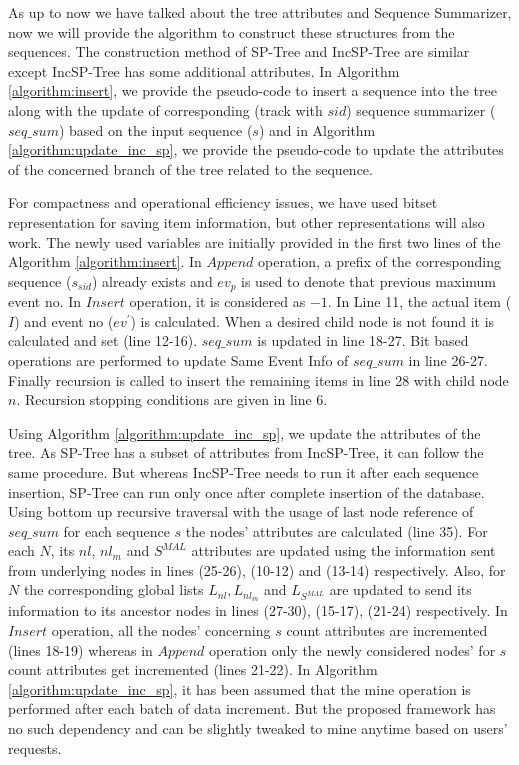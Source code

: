 As up to now we have talked about the tree attributes and Sequence Summarizer, now we will provide the algorithm to construct these structures from the sequences. The construction method of SP-Tree and IncSP-Tree are similar except IncSP-Tree has some additional attributes. In Algorithm \ref{algorithm:insert}, we provide the pseudo-code to insert a sequence into the tree along with the update of corresponding (track with $sid$) sequence summarizer ($seq\_sum$) based on the input sequence ($s$) and in Algorithm \ref{algorithm:update_inc_sp}, we provide the pseudo-code to update the attributes of the concerned branch of the tree related to the sequence.

For compactness and operational efficiency issues, we have used bitset representation for saving item information, but other representations will also work. The newly used variables are initially provided in the first two lines of the Algorithm \ref{algorithm:insert}. In $Append$ operation, a prefix of the corresponding sequence ($s_{sid}$) already exists and $ev_{p}$ is used to denote that previous maximum event no. In $Insert$ operation, it is considered as $-1$. In Line 11, the actual item ($I$) and event no ($ev^{\prime}$) is calculated. When a desired child node is not found it is calculated and set (line 12-16). $seq\_sum$ is updated in line 18-27. Bit based operations are performed to update Same Event Info of $seq\_sum$ in line 26-27. Finally recursion is called to insert the remaining items in line 28 with child node $n$. Recursion stopping conditions are given in line 6.

Using Algorithm \ref{algorithm:update_inc_sp}, we update the attributes of the tree. As SP-Tree has a subset of attributes from IncSP-Tree, it can follow the same procedure. But whereas IncSP-Tree needs to run it after each sequence insertion, SP-Tree can run only once after complete insertion of the database. Using bottom up recursive traversal with the usage of last node reference of $seq\_sum$ for each sequence $s$ the nodes' attributes are calculated (line 35). For each $N$, its $nl$, $nl_{m}$ and $S^{MAL}$ attributes are updated using the information sent from underlying nodes in lines (25-26), (10-12) and (13-14) respectively. Also, for $N$ the corresponding global lists $L_{nl}, L_{nl_{m}}$ and $L_{S^{MAL}}$ are updated to send its information to its ancestor nodes in lines (27-30), (15-17), (21-24) respectively. In $Insert$ operation, all the nodes' concerning $s$ count attributes are incremented (lines 18-19) whereas in $Append$ operation only the newly considered nodes' for $s$ count attributes get incremented (lines 21-22). In  Algorithm \ref{algorithm:update_inc_sp}, it has been assumed that the mine operation is performed after each batch of data increment. But the proposed framework has no such dependency and can be slightly tweaked to mine anytime based on users' requests. 







